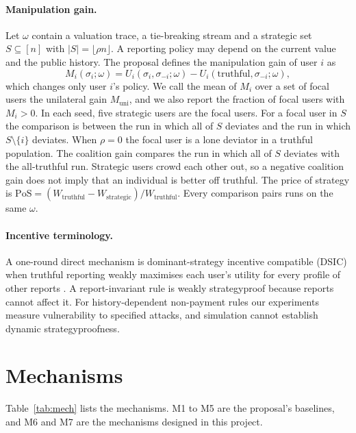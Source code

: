 \documentclass{article}
\theoremstyle{plain}
\theoremstyle{definition}
\newcommand{\Muni}{M_{\mathrm{uni}}}
\begin{document}
\paragraph{Manipulation gain.}
Let $\omega$ contain a valuation trace, a tie-breaking stream and a strategic set $S\subseteq[n]$ with $|S|=\lfloor\rho n\rfloor$.
A reporting policy may depend on the current value and the public history.
The proposal defines the manipulation gain of user $i$ as
\begin{equation}
M_i(\sigma_i;\omega)=U_i(\sigma_i,\sigma_{-i};\omega)-U_i(\text{truthful},\sigma_{-i};\omega),
\end{equation}
which changes only user $i$'s policy.
We call the mean of $M_i$ over a set of focal users the unilateral gain $\Muni$, and we also report the fraction of focal users with $M_i>0$.
In each seed, five strategic users are the focal users.
For a focal user in $S$ the comparison is between the run in which all of $S$ deviates and the run in which $S\setminus\{i\}$ deviates.
When $\rho=0$ the focal user is a lone deviator in a truthful population.
The coalition gain compares the run in which all of $S$ deviates with the all-truthful run.
Strategic users crowd each other out, so a negative coalition gain does not imply that an individual is better off truthful.
The price of strategy is $\mathrm{PoS}=(W_{\text{truthful}}-W_{\text{strategic}})/W_{\text{truthful}}$.
Every comparison pairs runs on the same $\omega$.

\paragraph{Incentive terminology.}
A one-round direct mechanism is dominant-strategy incentive compatible (DSIC) when truthful reporting weakly maximises each user's utility for every profile of other reports \cite{nisan2007agt}.
A report-invariant rule is weakly strategyproof because reports cannot affect it.
For history-dependent non-payment rules our experiments measure vulnerability to specified attacks, and simulation cannot establish dynamic strategyproofness.

\section{Mechanisms}
\label{sec:mechanisms}

Table~\ref{tab:mech} lists the mechanisms.
M1 to M5 are the proposal's baselines, and M6 and M7 are the mechanisms designed in this project.
\end{document}
